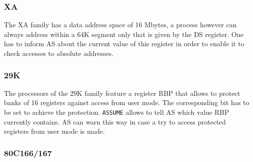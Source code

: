 \documentclass[12pt,twoside]{report}
\newcommand{\tty}[1]{{\tt #1}}
\begin{document}

\subsubsection{XA}

The XA family has a data address space of 16 Mbytes, a process however
can always address within a 64K segment only that is given by the DS
register.  One has to inform AS about the current value of this
register in order to enable it to check accesses to absolute
addresses.


\subsubsection{29K}

The processors of the 29K family feature a register RBP that allows
to protect banks of 16 registers against access from user mode.  The
corresponding bit has to be set to achieve the protection.  \tty{ASSUME}
allows to tell AS which value RBP currently contains.  AS can warn
this way in case a try to access protected registers from user mode
is made.


\subsubsection{80C166/167}
\end{document}
